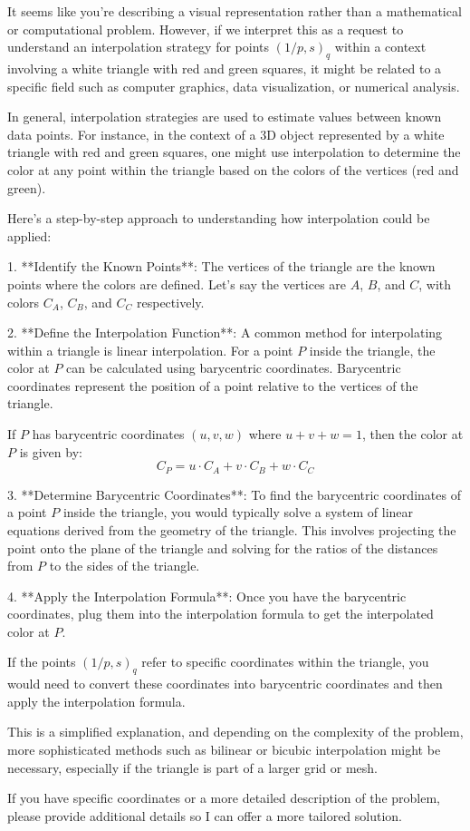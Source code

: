 It seems like you're describing a visual representation rather than a mathematical or computational problem. However, if we interpret this as a request to understand an interpolation strategy for points \((1/p, s)_q\) within a context involving a white triangle with red and green squares, it might be related to a specific field such as computer graphics, data visualization, or numerical analysis.

In general, interpolation strategies are used to estimate values between known data points. For instance, in the context of a 3D object represented by a white triangle with red and green squares, one might use interpolation to determine the color at any point within the triangle based on the colors of the vertices (red and green).

Here's a step-by-step approach to understanding how interpolation could be applied:

1. **Identify the Known Points**: The vertices of the triangle are the known points where the colors are defined. Let's say the vertices are \(A\), \(B\), and \(C\), with colors \(C_A\), \(C_B\), and \(C_C\) respectively.

2. **Define the Interpolation Function**: A common method for interpolating within a triangle is linear interpolation. For a point \(P\) inside the triangle, the color at \(P\) can be calculated using barycentric coordinates. Barycentric coordinates represent the position of a point relative to the vertices of the triangle.

   If \(P\) has barycentric coordinates \((u, v, w)\) where \(u + v + w = 1\), then the color at \(P\) is given by:
   \[
   C_P = u \cdot C_A + v \cdot C_B + w \cdot C_C
   \]

3. **Determine Barycentric Coordinates**: To find the barycentric coordinates of a point \(P\) inside the triangle, you would typically solve a system of linear equations derived from the geometry of the triangle. This involves projecting the point onto the plane of the triangle and solving for the ratios of the distances from \(P\) to the sides of the triangle.

4. **Apply the Interpolation Formula**: Once you have the barycentric coordinates, plug them into the interpolation formula to get the interpolated color at \(P\).

If the points \((1/p, s)_q\) refer to specific coordinates within the triangle, you would need to convert these coordinates into barycentric coordinates and then apply the interpolation formula.

This is a simplified explanation, and depending on the complexity of the problem, more sophisticated methods such as bilinear or bicubic interpolation might be necessary, especially if the triangle is part of a larger grid or mesh.

If you have specific coordinates or a more detailed description of the problem, please provide additional details so I can offer a more tailored solution.